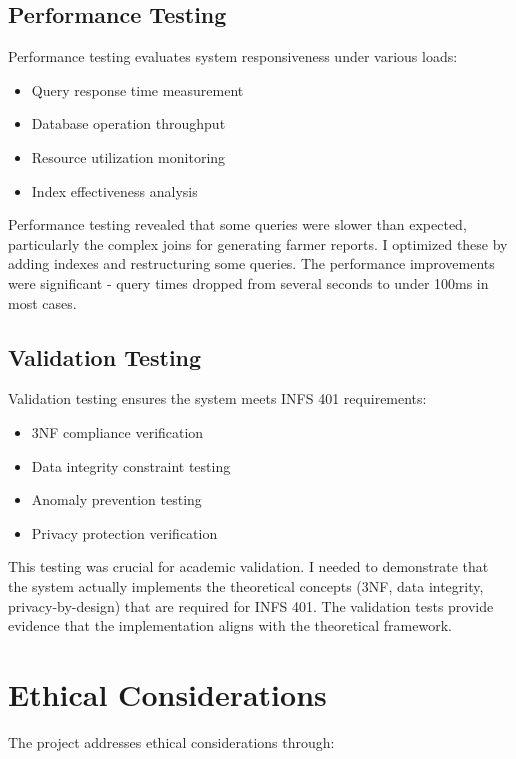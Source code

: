 \subsection{Performance Testing}

Performance testing evaluates system responsiveness under various loads:

\begin{itemize}
    \item Query response time measurement
    \item Database operation throughput
    \item Resource utilization monitoring
    \item Index effectiveness analysis
\end{itemize}

Performance testing revealed that some queries were slower than expected, particularly the complex joins for generating farmer reports. I optimized these by adding indexes and restructuring some queries. The performance improvements were significant - query times dropped from several seconds to under 100ms in most cases.

\subsection{Validation Testing}

Validation testing ensures the system meets INFS 401 requirements:

\begin{itemize}
    \item 3NF compliance verification
    \item Data integrity constraint testing
    \item Anomaly prevention testing
    \item Privacy protection verification
\end{itemize}

This testing was crucial for academic validation. I needed to demonstrate that the system actually implements the theoretical concepts (3NF, data integrity, privacy-by-design) that are required for INFS 401. The validation tests provide evidence that the implementation aligns with the theoretical framework.

\section{Ethical Considerations}

The project addresses ethical considerations through:

